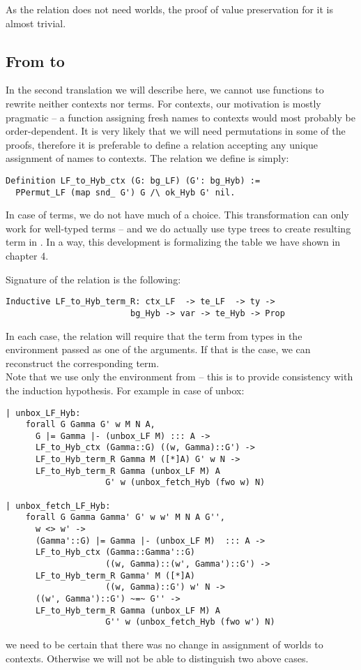As the relation does not need worlds, the proof of value preservation for it is almost trivial.

\subsection{From \langLF{} to \langHyb{}}

In the second translation we will describe here, we cannot use functions to rewrite neither contexts nor terms. For contexts, our motivation is mostly pragmatic -- a function assigning fresh names to contexts would most probably be order-dependent. It is very likely that we will need permutations in some of the proofs, therefore it is preferable to define a relation accepting any unique assignment of names to contexts. The relation we define is simply:
\begin{verbatim}
Definition LF_to_Hyb_ctx (G: bg_LF) (G': bg_Hyb) :=
  PPermut_LF (map snd_ G') G /\ ok_Hyb G' nil.
\end{verbatim}

In case of terms, we do not have much of a choice. This transformation can only work for well-typed terms -- and we do actually use type trees to create resulting term in \langHyb{}. In a way, this development is formalizing the table we have shown in chapter 4.

Signature of the relation is the following:
\begin{verbatim}
Inductive LF_to_Hyb_term_R: ctx_LF  -> te_LF  -> ty ->
                         bg_Hyb -> var -> te_Hyb -> Prop
\end{verbatim}
In each case, the relation will require that the term from \langLF{} types in the environment passed as one of the arguments. If that is the case, we can reconstruct the corresponding \langHyb{} term.\\

Note that we use only the environment from \langHyb{} -- this is to provide consistency with the induction hypothesis. For example in case of unbox:
\begin{verbatim}
| unbox_LF_Hyb:
    forall G Gamma G' w M N A,
      G |= Gamma |- (unbox_LF M) ::: A ->
      LF_to_Hyb_ctx (Gamma::G) ((w, Gamma)::G') ->
      LF_to_Hyb_term_R Gamma M ([*]A) G' w N ->
      LF_to_Hyb_term_R Gamma (unbox_LF M) A
                    G' w (unbox_fetch_Hyb (fwo w) N)

| unbox_fetch_LF_Hyb:
    forall G Gamma Gamma' G' w w' M N A G'',
      w <> w' ->
      (Gamma'::G) |= Gamma |- (unbox_LF M)  ::: A ->
      LF_to_Hyb_ctx (Gamma::Gamma'::G) 
                    ((w, Gamma)::(w', Gamma')::G') ->
      LF_to_Hyb_term_R Gamma' M ([*]A)
                    ((w, Gamma)::G') w' N ->
      ((w', Gamma')::G') ~=~ G'' ->
      LF_to_Hyb_term_R Gamma (unbox_LF M) A
                    G'' w (unbox_fetch_Hyb (fwo w') N)
\end{verbatim}
we need to be certain that  there was no change in assignment of worlds to contexts. Otherwise we will not be able to distinguish two above cases.\\

